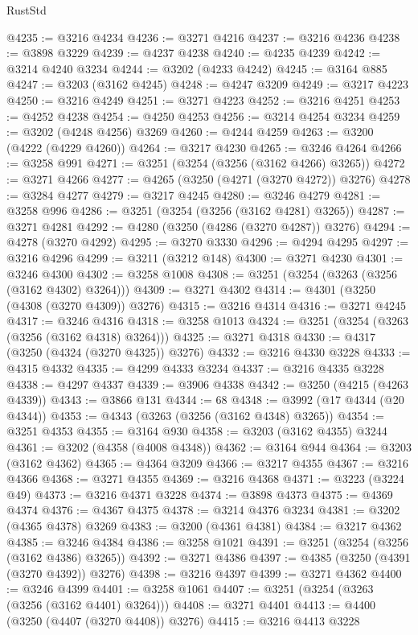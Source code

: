 \begin{lexlean}{RustStd}
\begin{coremodule}
@4235 := @3216 @4234
@4236 := @3271 @4216
@4237 := @3216 @4236
@4238 := @3898 @3229
@4239 := @4237 @4238
@4240 := @4235 @4239
@4242 := @3214 @4240 @3234
@4244 := @3202 (@4233 @4242)
@4245 := @3164 @885
@4247 := @3203 (@3162 @4245)
@4248 := @4247 @3209
@4249 := @3217 @4223
@4250 := @3216 @4249
@4251 := @3271 @4223
@4252 := @3216 @4251
@4253 := @4252 @4238
@4254 := @4250 @4253
@4256 := @3214 @4254 @3234
@4259 := @3202 (@4248 @4256) @3269
@4260 := @4244 @4259
@4263 := @3200 (@4222 (@4229 @4260))
@4264 := @3217 @4230
@4265 := @3246 @4264
@4266 := @3258 @991
@4271 := @3251 (@3254 (@3256 (@3162 @4266) @3265))
@4272 := @3271 @4266
@4277 := @4265 (@3250 (@4271 (@3270 @4272)) @3276)
@4278 := @3284 @4277
@4279 := @3217 @4245
@4280 := @3246 @4279
@4281 := @3258 @996
@4286 := @3251 (@3254 (@3256 (@3162 @4281) @3265))
@4287 := @3271 @4281
@4292 := @4280 (@3250 (@4286 (@3270 @4287)) @3276)
@4294 := @4278 (@3270 @4292)
@4295 := @3270 @3330
@4296 := @4294 @4295
@4297 := @3216 @4296
@4299 := @3211 (@3212 @148)
@4300 := @3271 @4230
@4301 := @3246 @4300
@4302 := @3258 @1008
@4308 := @3251 (@3254 (@3263 (@3256 (@3162 @4302) @3264)))
@4309 := @3271 @4302
@4314 := @4301 (@3250 (@4308 (@3270 @4309)) @3276)
@4315 := @3216 @4314
@4316 := @3271 @4245
@4317 := @3246 @4316
@4318 := @3258 @1013
@4324 := @3251 (@3254 (@3263 (@3256 (@3162 @4318) @3264)))
@4325 := @3271 @4318
@4330 := @4317 (@3250 (@4324 (@3270 @4325)) @3276)
@4332 := @3216 @4330 @3228
@4333 := @4315 @4332
@4335 := @4299 @4333 @3234
@4337 := @3216 @4335 @3228
@4338 := @4297 @4337
@4339 := @3906 @4338
@4342 := @3250 (@4215 (@4263 @4339))
@4343 := @3866 @131
@4344 := 68
@4348 := @3992 (@17 @4344 (@20 @4344))
@4353 := @4343 (@3263 (@3256 (@3162 @4348) @3265))
@4354 := @3251 @4353
@4355 := @3164 @930
@4358 := @3203 (@3162 @4355) @3244
@4361 := @3202 (@4358 (@4008 @4348))
@4362 := @3164 @944
@4364 := @3203 (@3162 @4362)
@4365 := @4364 @3209
@4366 := @3217 @4355
@4367 := @3216 @4366
@4368 := @3271 @4355
@4369 := @3216 @4368
@4371 := @3223 (@3224 @49)
@4373 := @3216 @4371 @3228
@4374 := @3898 @4373
@4375 := @4369 @4374
@4376 := @4367 @4375
@4378 := @3214 @4376 @3234
@4381 := @3202 (@4365 @4378) @3269
@4383 := @3200 (@4361 @4381)
@4384 := @3217 @4362
@4385 := @3246 @4384
@4386 := @3258 @1021
@4391 := @3251 (@3254 (@3256 (@3162 @4386) @3265))
@4392 := @3271 @4386
@4397 := @4385 (@3250 (@4391 (@3270 @4392)) @3276)
@4398 := @3216 @4397
@4399 := @3271 @4362
@4400 := @3246 @4399
@4401 := @3258 @1061
@4407 := @3251 (@3254 (@3263 (@3256 (@3162 @4401) @3264)))
@4408 := @3271 @4401
@4413 := @4400 (@3250 (@4407 (@3270 @4408)) @3276)
@4415 := @3216 @4413 @3228

\end{coremodule}
\end{lexlean}

